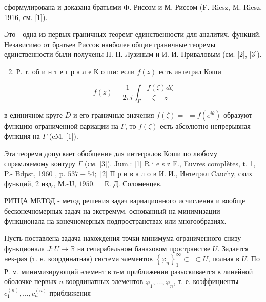\documentclass[10pt]{article}
\begin{document}
сформулирована и доказана братьями Ф. Риссом и М. Риссом (F. Riesz, M. Riesz, 1916, см. [1]).



Это - одна из первых граничных теоремг единственности для аналитич. функций. Независимо от братьев Риссов наиболее общие граничные теоремы единственности были получены Н. Н. Лузиным и И. И. Приваловым (см. [2], [3]).



\begin{enumerate}

  \setcounter{enumi}{1}

  \item Р. т. об и н т е г р а л е К о ши: если $f(z)$ есть интеграл Коши

\end{enumerate}



\[

f(z)=\frac{1}{2 \pi i} \int_{\Gamma} \frac{f(\zeta) d \zeta}{\zeta-z}

\]



в единичном круге $D$ и его граничные значения $f(\zeta)=$ $=f\left(e^{i \theta}\right)$ образуют функцию ограниченной вариации на $\Gamma$, то $f(\zeta)$ есть абсолютно непрерывная функция на $\Gamma$ (cM. [1]).



Эта теорема допускает обобщение для интегралов Коши по любому спрямляемому контуру $\Gamma$ (см. [3]). Jum.: [1] R i e s z F., Euvres complètes, t. 1, P.- Bdpst, 1960 , p. $537-54 ;$ [2] П р и в а л о в И. И., Интеграл Cauchy, ских функций, 2 изд., М.-ЈЈ, $1950 . \quad$ Е. Д. Соломенцев.



РИТЦА МЕТОД - метод решения задач вариационного исчисления и вообще бесконечномерных задач на экстремум, основанный на минимизации функционала на конечномерных подпространствах или многообразиях.



Пусть поставлена задача нахождения точки минимума ограниченного снизу функционала $J: U \rightarrow \mathbb{R}$ на сепарабельном банаховом пространстве $U$. Задается нек-рая (т. н. координатная) система элементов $\left\{\varphi_{n}\right\}_{1}^{\infty} \subset$ $\subset U$, полная в $U$. По Р. м. минимизирующий әлемент в n-м приближении разыскивается в линейной оболочке первых $n$ координатных элементов $\varphi_{1}, \ldots, \varphi_{n}$, т. е. коэффициенты $c_{1}^{(n)}, \ldots, c_{n}^{(n)}$ приближения
\end{document}
